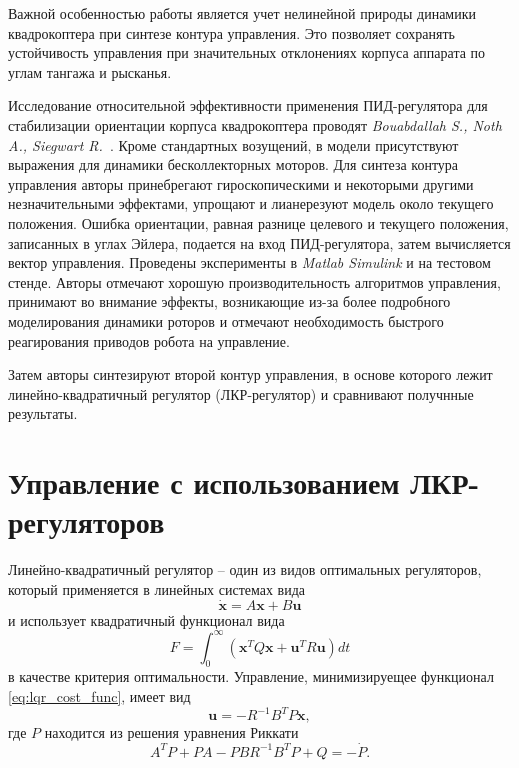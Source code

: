 \documentclass[a4paper,14pt,oneside,openany]{memoir}
\begin{document}
	Важной особенностью работы является учет нелинейной природы динамики квадрокоптера при синтезе контура управления. Это позволяет сохранять устойчивость управления при значительных отклонениях корпуса аппарата по углам тангажа и рысканья.
	
	Исследование относительной эффективности применения ПИД-регулятора для стабилизации ориентации корпуса квадрокоптера проводят \textit{Bouabdallah S., Noth A., Siegwart R.}~\cite{Bouabdallah01}. Кроме стандартных возущений, в модели присутствуют выражения для динамики бесколлекторных моторов. Для синтеза контура управления авторы принебрегают гироскопическими и некоторыми другими незначительными эффектами, упрощают и лианерезуют модель около текущего положения. Ошибка ориентации, равная разнице целевого и текущего положения, записанных в углах Эйлера, подается на вход ПИД-регулятора, затем вычисляется вектор управления. Проведены эксперименты в \textit{Matlab Simulink} и на тестовом стенде. Авторы отмечают хорошую производительность алгоритмов управления, принимают во внимание эффекты, возникающие из-за более подробного моделирования динамики роторов и отмечают необходимость быстрого реагирования приводов робота на управление.
	
	Затем авторы синтезируют второй контур управления, в основе которого лежит линейно-квадратичный регулятор (ЛКР-регулятор) и сравнивают получнные результаты.
		
	
	\section{Управление с использованием ЛКР-регуляторов}
	
	Линейно-квадратичный регулятор -- один из видов оптимальных регуляторов, который применяется в линейных системах вида
	\begin{equation} \label{eq:linear_dyn_system}
	\dot{\bm{x}} = A\bm{x} + B\bm{u}
	\end{equation}
	и  использует квадратичный функционал вида
 	\begin{equation} \label{eq:lqr_cost_func}
 	F = \int_0^{\infty}{(\bm{x}^T Q \bm{x} + \bm{u}^T R \bm{u})} dt
 	\end{equation}
	в качестве критерия оптимальности. Управление, минимизируещее функционал \eqref{eq:lqr_cost_func}, имеет вид
 	\begin{equation} \label{eq:lqr_control_law}
 	\bm{u} = -R^{-1} B^T P \bm{x},
 	\end{equation}
 	где $P$ находится из решения уравнения Риккати
 	\begin{equation} \label{eq:riqatty}
 	A^T P + P A - P B R^{-1} B^T P + Q = -\dot{P}.
 	\end{equation}
	
\end{document}

